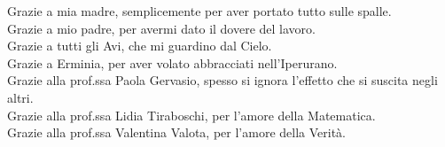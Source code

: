 Grazie a mia madre, semplicemente per aver portato tutto sulle spalle. \\
Grazie a mio padre, per avermi dato il dovere del lavoro.\\
Grazie a tutti gli Avi, che mi guardino dal Cielo.\\
Grazie a Erminia, per aver volato abbracciati nell'Iperurano.\\
Grazie alla prof.ssa Paola Gervasio, spesso si ignora l'effetto che si suscita negli altri. \\
Grazie alla prof.ssa Lidia Tiraboschi, per l'amore della Matematica.\\
Grazie alla prof.ssa Valentina Valota, per l'amore della Verità.